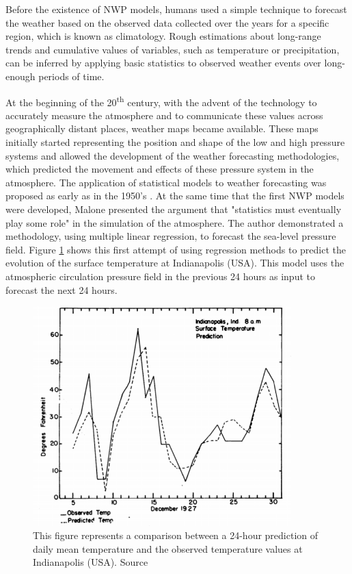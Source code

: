 Before the existence of NWP models, humans used a simple technique to forecast the weather based on the observed data collected over the years for a specific region, which is known as climatology. Rough estimations about long-range trends and cumulative values of variables, such as temperature or precipitation, can be inferred by applying basic statistics to observed weather events over long-enough periods of time.

\medskip

At the beginning of the 20\textsuperscript{th} century, with the advent of the technology to accurately measure the atmosphere and to communicate these values across geographically distant places, weather maps became available. These maps initially started representing the position and shape of the low and high pressure systems and allowed the development of the weather forecasting methodologies, which predicted the movement and effects of these pressure system in the atmosphere. The application of statistical models to weather forecasting was proposed as early as in the 1950's \citep{malone1955application}. At the same time that the first NWP models were developed, Malone presented the argument that "statistics must eventually play some role" in the simulation of the atmosphere. The author demonstrated a methodology, using multiple linear regression, to forecast the sea-level pressure field. Figure \ref{regression_meteo} shows this first attempt of using regression methods to predict the evolution of the surface temperature at Indianapolis (USA). This model uses the atmospheric circulation pressure field in the previous 24 hours as input to forecast the next 24 hours.

\medskip

\begin{figure}[h]
 \centerline{\includegraphics[width=10cm]{regression_meteo.png}} \caption{This figure represents a comparison between a 24-hour prediction of daily mean temperature and the observed temperature values at Indianapolis (USA). Source \citep{malone1955application}}\label{regression_meteo}
\end{figure}

